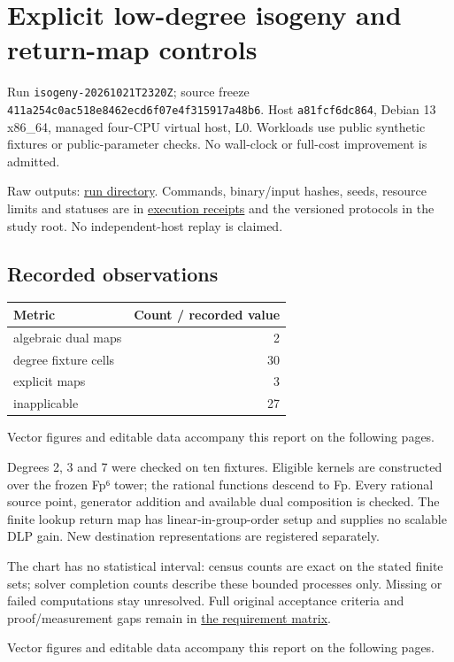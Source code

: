 \documentclass[
  10pt,
  letterpaper,
  landscape]{article}
\author{}
\date{}
\begin{document}
\section{Explicit low-degree isogeny and return-map
controls}\label{explicit-low-degree-isogeny-and-return-map-controls}

Run \texttt{isogeny-20261021T2320Z}; source freeze
\texttt{411a254c0ac518e8462ecd6f07e4f315917a48b6}. Host
\texttt{a81fcf6dc864}, Debian 13 x86\_64, managed four-CPU virtual host,
L0. Workloads use public synthetic fixtures or public-parameter checks.
No wall-clock or full-cost improvement is admitted.

Raw outputs:
\href{../../../execution-v1/runs/isogeny-20261021T2320Z/}{run
directory}. Commands, binary/input hashes, seeds, resource limits and
statuses are in \href{../../../execution-v1/}{execution receipts} and
the versioned protocols in the study root. No independent-host replay is
claimed.

\subsection{Recorded observations}\label{recorded-observations}

\begin{longtable}[]{@{}lr@{}}
\toprule\noalign{}
Metric & Count / recorded value \\
\midrule\noalign{}
\endhead
\bottomrule\noalign{}
\endlastfoot
algebraic dual maps & 2 \\
degree fixture cells & 30 \\
explicit maps & 3 \\
inapplicable & 27 \\
\end{longtable}

Vector figures and editable data accompany this report on the following pages.

Degrees 2, 3 and 7 were checked on ten fixtures. Eligible kernels are
constructed over the frozen Fp⁶ tower; the rational functions descend to
Fp. Every rational source point, generator addition and available dual
composition is checked. The finite lookup return map has
linear-in-group-order setup and supplies no scalable DLP gain. New
destination representations are registered separately.

The chart has no statistical interval: census counts are exact on the
stated finite sets; solver completion counts describe these bounded
processes only. Missing or failed computations stay unresolved. Full
original acceptance criteria and proof/measurement gaps remain in
\href{../../../EXPERIMENTS.md}{the requirement matrix}.

Vector figures and editable data accompany this report on the following pages.
\end{document}
